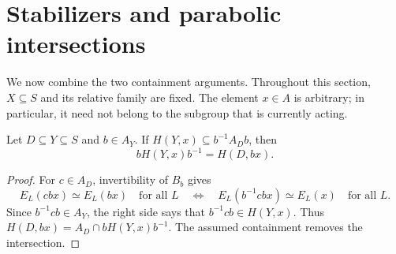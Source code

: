 \section{Stabilizers and parabolic intersections}
\label{sec:stabilizers}

We now combine the two containment arguments. Throughout this section,
$X\subseteq S$ and its relative family are fixed. The element $x\in A$
is arbitrary; in particular, it need not belong to the subgroup that
is currently acting.

\begin{lemma}
\label{stab:conjugation}
Let $D\subseteq Y\subseteq S$ and $b\in A_Y$. If
$H(Y,x)\subseteq b^{-1}A_Db$, then
\[
 bH(Y,x)b^{-1}=H(D,bx).
\]
\end{lemma}
\begin{proof}
For $c\in A_D$, invertibility of $B_b$ gives
\[
 E_L(cbx)\simeq E_L(bx)\quad\text{for all }L
 \quad\Longleftrightarrow\quad
 E_L(b^{-1}cbx)\simeq E_L(x)\quad\text{for all }L.
\]
Since $b^{-1}cb\in A_Y$, the right side says that
$b^{-1}cb\in H(Y,x)$. Thus
$H(D,bx)=A_D\cap bH(Y,x)b^{-1}$. The assumed containment removes the
intersection.
\end{proof}

